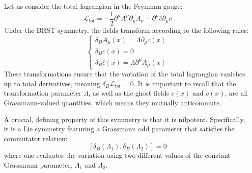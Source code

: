 Let us consider the total lagrangian in the Feynman gauge:
\begin{equation} \label{eq:lagrangian_feynman}
    \mathcal{L}_{tot} = -\frac{1}{2}\partial^\mu A^\nu \partial_\mu A_\nu - \partial^\mu \bar{c} \partial_\mu c
\end{equation}
Under the BRST symmetry, the fields transform according to the following rules:
\begin{equation} \label{eq:brst_transformations}
    \begin{cases}
        \delta_B A_\mu(x) = \Lambda \partial_\mu c(x) \\
        \delta_B c(x) = 0                             \\
        \delta_B \bar{c}(x) = \Lambda \partial^\mu A_\mu(x)
    \end{cases}
\end{equation}
These transformations ensure that the variation of the total lagrangian vanishes up to total derivatives, meaning \(\delta_B \mathcal{L}_{tot} = 0\). It is important to recall that the transformation parameter \(\Lambda\), as well as the ghost fields \(c(x)\) and \(\bar{c}(x)\), are all Grassmann-valued quantities, which means they mutually anticommute.

A crucial, defining property of this symmetry is that it is nilpotent. Specifically, it is a Lie symmetry featuring a Grassmann odd parameter that satisfies the commutator relation:
\begin{equation} \label{eq:brst_commutator}
    [\delta_B(\Lambda_1), \delta_B(\Lambda_2)] = 0
\end{equation}
where one evaluates the variation using two different values of the constant Grassmann parameter, \(\Lambda_1\) and \(\Lambda_2\).

